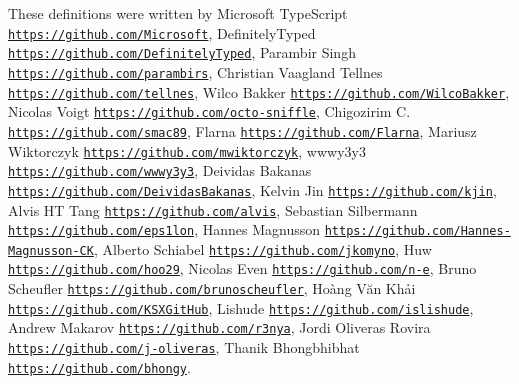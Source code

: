 These definitions were written by Microsoft Type\+Script \href{https://github.com/Microsoft}{\tt https\+://github.\+com/\+Microsoft}, Definitely\+Typed \href{https://github.com/DefinitelyTyped}{\tt https\+://github.\+com/\+Definitely\+Typed}, Parambir Singh \href{https://github.com/parambirs}{\tt https\+://github.\+com/parambirs}, Christian Vaagland Tellnes \href{https://github.com/tellnes}{\tt https\+://github.\+com/tellnes}, Wilco Bakker \href{https://github.com/WilcoBakker}{\tt https\+://github.\+com/\+Wilco\+Bakker}, Nicolas Voigt \href{https://github.com/octo-sniffle}{\tt https\+://github.\+com/octo-\/sniffle}, Chigozirim C. \href{https://github.com/smac89}{\tt https\+://github.\+com/smac89}, Flarna \href{https://github.com/Flarna}{\tt https\+://github.\+com/\+Flarna}, Mariusz Wiktorczyk \href{https://github.com/mwiktorczyk}{\tt https\+://github.\+com/mwiktorczyk}, wwwy3y3 \href{https://github.com/wwwy3y3}{\tt https\+://github.\+com/wwwy3y3}, Deividas Bakanas \href{https://github.com/DeividasBakanas}{\tt https\+://github.\+com/\+Deividas\+Bakanas}, Kelvin Jin \href{https://github.com/kjin}{\tt https\+://github.\+com/kjin}, Alvis HT Tang \href{https://github.com/alvis}{\tt https\+://github.\+com/alvis}, Sebastian Silbermann \href{https://github.com/eps1lon}{\tt https\+://github.\+com/eps1lon}, Hannes Magnusson \href{https://github.com/Hannes-Magnusson-CK}{\tt https\+://github.\+com/\+Hannes-\/\+Magnusson-\/\+CK}, Alberto Schiabel \href{https://github.com/jkomyno}{\tt https\+://github.\+com/jkomyno}, Huw \href{https://github.com/hoo29}{\tt https\+://github.\+com/hoo29}, Nicolas Even \href{https://github.com/n-e}{\tt https\+://github.\+com/n-\/e}, Bruno Scheufler \href{https://github.com/brunoscheufler}{\tt https\+://github.\+com/brunoscheufler}, Hoàng Văn Khải \href{https://github.com/KSXGitHub}{\tt https\+://github.\+com/\+K\+S\+X\+Git\+Hub}, Lishude \href{https://github.com/islishude}{\tt https\+://github.\+com/islishude}, Andrew Makarov \href{https://github.com/r3nya}{\tt https\+://github.\+com/r3nya}, Jordi Oliveras Rovira \href{https://github.com/j-oliveras}{\tt https\+://github.\+com/j-\/oliveras}, Thanik Bhongbhibhat \href{https://github.com/bhongy}{\tt https\+://github.\+com/bhongy}. 